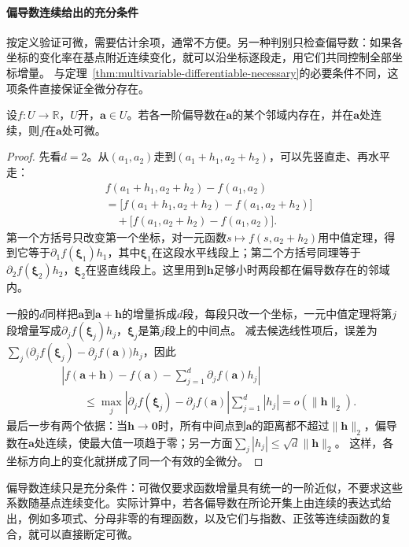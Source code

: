 \paragraph{偏导数连续给出的充分条件}
按定义验证可微，需要估计余项，通常不方便。另一种判别只检查偏导数：如果各坐标的变化率在基点附近连续变化，就可以沿坐标逐段走，用它们共同控制全部坐标增量。
与定理~\ref{thm:multivariable-differentiable-necessary}的必要条件不同，这项条件直接保证全微分存在。
\begin{theorem}[偏导数连续与可微性]
\label{thm:multivariable-continuous-partials-sufficient}
设$f:U\to\mathbb R$，$U$开，$\bm a\in U$。若各一阶偏导数在$\bm a$的某个邻域内存在，并在$\bm a$处连续，则$f$在$\bm a$处可微。
\end{theorem}
\begin{proof}
先看$d=2$。从$(a_1,a_2)$走到$(a_1+h_1,a_2+h_2)$，可以先竖直走、再水平走：
\[
 \begin{aligned}
 &f(a_1+h_1,a_2+h_2)-f(a_1,a_2)\\
 &=\bigl[f(a_1+h_1,a_2+h_2)-f(a_1,a_2+h_2)\bigr]\\
 &\quad+\bigl[f(a_1,a_2+h_2)-f(a_1,a_2)\bigr].
 \end{aligned}
\]
第一个方括号只改变第一个坐标，对一元函数$s\mapsto f(s,a_2+h_2)$用中值定理，得到它等于$\partial_1f(\bm\xi_1)h_1$，其中$\bm\xi_1$在这段水平线段上；第二个方括号同理等于$\partial_2f(\bm\xi_2)h_2$，$\bm\xi_2$在竖直线段上。这里用到$\bm h$足够小时两段都在偏导数存在的邻域内。

一般的$d$同样把$\bm a$到$\bm a+\bm h$的增量拆成$d$段，每段只改一个坐标，一元中值定理将第$j$段增量写成$\partial_jf(\bm\xi_j)h_j$，$\bm\xi_j$是第$j$段上的中间点。
减去候选线性项后，误差为$\sum_j\bigl(\partial_jf(\bm\xi_j)-\partial_jf(\bm a)\bigr)h_j$，因此
\[
 \begin{aligned}
 &\left|f(\bm a+\bm h)-f(\bm a)-\sum_{j=1}^d\partial_j f(\bm a)h_j\right|\\
 &\qquad\leq \max_j\left|\partial_j f(\bm\xi_j)-\partial_j f(\bm a)\right|
       \sum_{j=1}^d|h_j|
 =o(\lVert\bm h\rVert_2).
 \end{aligned}
\]
最后一步有两个依据：当$\bm h\to\bm0$时，所有中间点到$\bm a$的距离都不超过$\lVert\bm h\rVert_2$，偏导数在$\bm a$处连续，使最大值一项趋于零；另一方面$\sum_j|h_j|\leq\sqrt d\lVert\bm h\rVert_2$。
这样，各坐标方向上的变化就拼成了同一个有效的全微分。
\end{proof}
偏导数连续只是充分条件：可微仅要求函数增量具有统一的一阶近似，不要求这些系数随基点连续变化。实际计算中，若各偏导数在所论开集上由连续的表达式给出，例如多项式、分母非零的有理函数，以及它们与指数、正弦等连续函数的复合，就可以直接断定可微。

